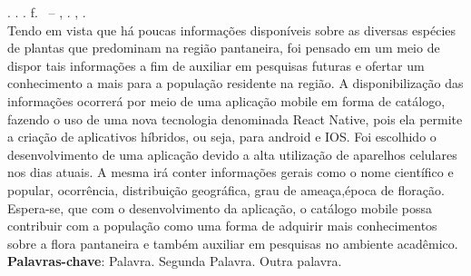 
\begin{resumo}[RESUMO]
\begin{SingleSpacing}

\imprimirautorcitacao. \imprimirtitulo. \imprimirdata. \pageref {LastPage} f. \imprimirprojeto\ – \imprimirprograma, \imprimirinstituicao. \imprimirlocal, \imprimirdata.\\

Tendo em vista que há poucas informações disponíveis sobre as diversas espécies de plantas que predominam na região pantaneira, foi pensado em um meio de dispor tais informações a fim de auxiliar em pesquisas futuras e ofertar um conhecimento a mais para a população residente na região.
A disponibilização das informações ocorrerá por meio de uma aplicação mobile em forma de catálogo, fazendo o uso de uma nova tecnologia denominada React Native, pois ela permite a criação de aplicativos híbridos, ou seja, para android e IOS.
Foi escolhido o desenvolvimento de uma aplicação devido a alta utilização de aparelhos celulares nos dias atuais. A mesma  irá conter informações gerais como o nome científico e popular, ocorrência, distribuição geográfica, grau de ameaça,época de floração.
Espera-se, que com o desenvolvimento da aplicação, o  catálogo mobile possa contribuir com a população como uma forma de adquirir mais conhecimentos sobre a flora pantaneira e também auxiliar em pesquisas no ambiente acadêmico.\\


\textbf{Palavras-chave}: Palavra. Segunda Palavra. Outra palavra.

\end{SingleSpacing}
\end{resumo}


